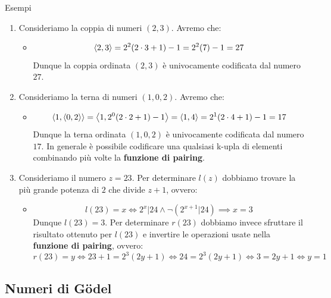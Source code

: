 \begin{generalbox}[colframe=azure-gradient-3!90!black]{Esempi}
  \begin{enumerate}
    \item Consideriamo la coppia di numeri \((2,3)\). Avremo che:
    \begin{itemize}
      \item [] \begin{equation}
        \displaystyle{\left\langle{ 2,3 }\right\rangle} =2^2(2\cdot 3+1)-1=2^2(7)-1=27
      \end{equation}
      Dunque la coppia ordinata \((2,3)\) è univocamente codificata dal numero \(27\).
    \end{itemize}
    \item Consideriamo la terna di numeri \((1,0,2)\). Avremo che:
    \begin{itemize}
      \item [] \begin{equation}
        \displaystyle{\left\langle{ 1, \displaystyle{\left\langle{ 0,2 }\right\rangle} }\right\rangle} = \displaystyle{\left\langle{ 1,2^0(2\cdot 2+1)-1 }\right\rangle} = \displaystyle{\left\langle{ 1,4 }\right\rangle} = 2^1(2\cdot 4+1)-1=17
      \end{equation}
      Dunque la terna ordinata \((1,0,2)\) è univocamente codificata dal numero \(17\). In generale è possibile codificare una qualsiasi k-upla di elementi combinando più volte la \textbf{funzione di pairing}.
    \end{itemize}
    \item Consideriamo il numero \(z=23\). Per determinare \(l(z)\) dobbiamo trovare la più grande potenza di \(2\) che divide \(z+1\), ovvero:
    \begin{itemize}
      \item [] \begin{equation}
        l(23)=x \iff 2^x \vert 24 \land \neg(2^{x+1}\vert 24) \implies x=3
      \end{equation}
      Dunque \(l(23)=3\). Per determinare \(r(23)\) dobbiamo invece sfruttare il risultato ottenuto per \(l(23)\) e invertire le operazioni usate nella \textbf{funzione di pairing}, ovvero:
      \begin{equation}
          r(23) = y \iff 23+1=2^3(2y+1) \iff 24=2^3(2y+1) \iff 3=2y+1 \iff y=1
      \end{equation}
    \end{itemize}
  \end{enumerate}
\end{generalbox}


\subsection{Numeri di Gödel}

